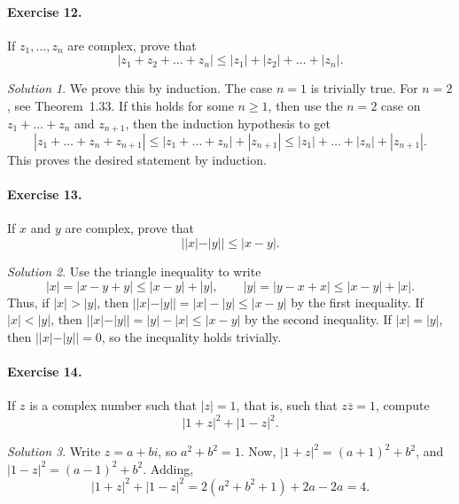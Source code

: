 \documentclass[11pt]{report}
\theoremstyle{remark}
\newtheorem*{solution}{Solution}
\begin{document}
    \paragraph{Exercise 12.} If $z_1, \dots, z_n$ are complex, prove that \[
        |z_1 + z_2 + \dots + z_n| \leq |z_1| + |z_2| + \dots + |z_n|.
    \]
    \begin{solution}
        We prove this by induction. The case $n = 1$ is trivially true. For $n = 2$,
        see Theorem~1.33. If this holds for some $n \geq 1$, then use the $n = 2$
        case on $z_1 + \dots + z_n$ and $z_{n + 1}$, then the induction hypothesis
        to get \[
            |z_1 + \dots + z_n + z_{n + 1}| \leq |z_1 + \dots + z_n| + |z_{n + 1}|
            \leq |z_1| + \dots + |z_n| + |z_{n + 1}|.
        \] This proves the desired statement by induction.
    \end{solution}

    \paragraph{Exercise 13.} If $x$ and $y$ are complex, prove that \[
         | |x| - |y| | \leq |x - y|.
    \]
    \begin{solution}
        Use the triangle inequality to write \[
            |x| = |x - y + y| \leq |x - y| + |y|, \qquad
            |y| = |y - x + x| \leq |x - y| + |x|.
        \] Thus, if $|x| > |y|$, then $| |x| - |y| | = |x| - |y| \leq |x - y|$ by
        the first inequality. If $|x| < |y|$, then $| |x| - |y| | = |y| - |x| \leq
        |x - y|$ by the second inequality. If $|x| = |y|$, then $| |x| - |y| | = 0$,
        so the inequality holds trivially.
    \end{solution}
    
    \paragraph{Exercise 14.} If $z$ is a complex number such that $|z| = 1$, that
    is, such that $z\overline{z} = 1$, compute \[
        |1 + z|^2 + |1 - z|^2.
    \]
    \begin{solution}
        Write $z = a + bi$, so $a^2 + b^2 = 1$. Now, $|1 + z|^2 = (a + 1)^2 + b^2$,
        and $|1 - z|^2 = (a - 1)^2 + b^2$. Adding, \[
            |1 + z|^2 + |1 - z|^2 = 2(a^2 + b^2 + 1) + 2a - 2a = 4.
        \] 
    \end{solution}
    
\end{document}
